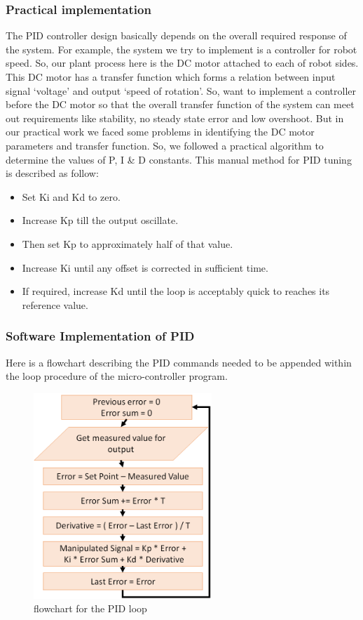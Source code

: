 \documentclass[12pt]{article}
\begin{document}
	\subsubsection{Practical implementation}
	The PID controller design basically depends on the overall required response of the system. For example, the system we try to implement is a controller for robot speed. So, our plant process here is the DC motor attached to each of robot sides. This DC motor has a transfer function which forms a relation between input signal ‘voltage’ and output ‘speed of rotation’. So, want to implement a controller before the DC motor so that the overall transfer function of the system can meet out requirements like stability, no steady state error and low overshoot.
	But in our practical work we faced some problems in identifying the DC motor parameters and transfer function. So, we followed a practical algorithm to determine the values of P, I \& D constants. This manual method for PID tuning is described as follow:
	\begin{itemize}
		\item Set Ki and Kd to zero.
		\item Increase Kp till the output oscillate.
		\item Then set Kp to approximately half of that value.
		\item Increase Ki until any offset is corrected in sufficient time.
		\item If required, increase Kd until the loop is acceptably quick to reaches its reference value. 
	\end{itemize}
	
	\newpage
	\subsubsection{Software Implementation of PID}
	Here is a flowchart describing the PID commands needed to be appended within the loop procedure of the micro-controller program.
	\begin{figure}[H]
		\centering
		\includegraphics[width = 0.6\textwidth]{Fig/pid.png}
		\caption{flowchart for the PID loop}
		\label{fig:pid}
	\end{figure}
\end{document}
